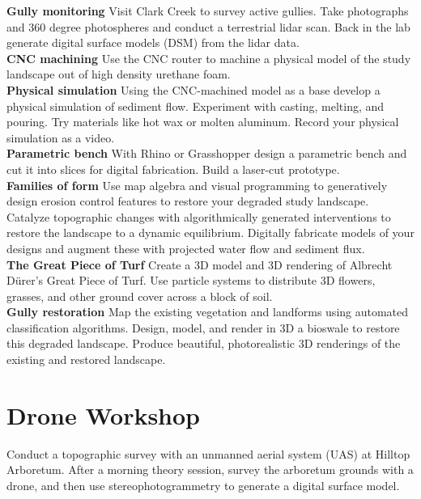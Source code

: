 \documentclass[11pt,article,oneside]{memoir}
\begin{document}
\noindent \textbf{Gully monitoring}
Visit Clark Creek to survey active gullies.
Take photographs and 360 degree photospheres and
conduct a terrestrial lidar scan.
Back in the lab generate digital surface models (DSM)
from the lidar data.\\

\noindent \textbf{CNC machining}
Use the CNC router to machine a physical model
of the study landscape out of high density urethane foam.\\

\noindent \textbf{Physical simulation}
Using the CNC-machined model as a base
develop a physical simulation of sediment flow.
Experiment with casting, melting, and pouring. 
Try materials like hot wax or molten aluminum. 
Record your physical simulation as a video.\\

\noindent \textbf{Parametric bench}
With Rhino or Grasshopper
design a parametric bench and cut it into slices
for digital fabrication.
Build a laser-cut prototype.\\

\noindent \textbf{Families of form}
Use map algebra and visual programming to generatively design
erosion control features to restore your degraded study landscape.
Catalyze topographic changes 
with algorithmically generated interventions
to restore the landscape to a dynamic equilibrium.  
Digitally fabricate models of your designs
and augment these with projected water flow and sediment flux.\\

\noindent \textbf{The Great Piece of Turf}
Create a 3D model and 3D rendering of
Albrecht Dürer's Great Piece of Turf.
Use particle systems to distribute 3D flowers, grasses,
and other ground cover across a block of soil.\\

\noindent \textbf{Gully restoration}
Map the existing vegetation and landforms
using automated classification algorithms.
Design, model, and render in 3D
a bioswale to restore this degraded landscape.
Produce beautiful, photorealistic 3D renderings  
of the existing and restored landscape.\\

\section{Drone Workshop}
Conduct a topographic survey with an unmanned aerial system (UAS)
at Hilltop Arboretum. 
After a morning theory session, 
survey the arboretum grounds with a drone,
and then use stereophotogrammetry to generate a digital surface model.
\end{document}
